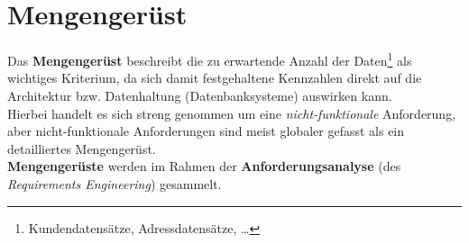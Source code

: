 \section{Mengengerüst}

\begin{tcolorbox}[title=Mengengerüst]
    Das \textbf{Mengengerüst} beschreibt die zu erwartende Anzahl der Daten\footnote{Kundendatensätze, Adressdatensätze, \ldots} als wichtiges Kriterium, da sich damit festgehaltene Kennzahlen direkt auf die Architektur bzw. Datenhaltung (Datenbanksysteme) auswirken kann.\\

    \noindent
    Hierbei handelt es sich streng genommen um eine \textit{nicht-funktionale} Anforderung, aber nicht-funktionale Anforderungen sind meist globaler gefasst als ein detailliertes Mengengerüst.\\

    \noindent
    \textbf{Mengengerüste} werden im Rahmen der \textbf{Anforderungsanalyse} (des \textit{Requirements Engineering}) gesammelt.

\end{tcolorbox}


